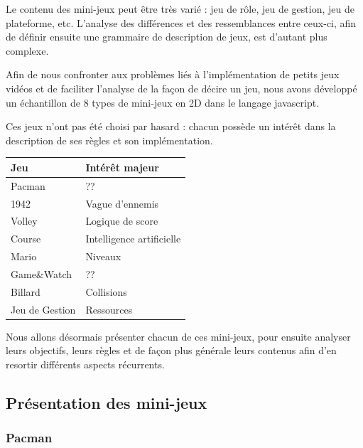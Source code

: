 Le contenu des mini-jeux peut être très varié : jeu de rôle, jeu de gestion, jeu de plateforme, etc.
L'analyse des différences et des ressemblances entre ceux-ci, afin de définir ensuite une grammaire de description de jeux, est d'autant plus complexe.

Afin de nous confronter aux problèmes liés à l'implémentation de petits jeux vidéos et de faciliter l'analyse de la façon de décire un jeu, 
nous avons développé un échantillon de 8 types de mini-jeux en 2D dans le langage javascript.

Ces jeux n'ont pas été choisi par hasard : chacun possède un intérêt dans la description de ses règles et son implémentation.

\vspace{0.5cm}

\begin{tabular}{l|l}
 Jeu & Intérêt majeur \\
 \hline
 Pacman & ?? \\
 1942 & Vague d'ennemis \\
 Volley & Logique de score \\
 Course & Intelligence artificielle \\
 Mario & Niveaux \\
 Game\&Watch & ?? \\
 Billard & Collisions \\
 Jeu de Gestion & Ressources \\
\end{tabular}

\vspace{0.5cm}

Nous allons désormais présenter chacun de ces mini-jeux, pour ensuite analyser leurs objectifs, 
leurs règles et de façon plus générale leurs contenus afin d'en resortir différents aspects récurrents.

\subsection{Présentation des mini-jeux}


\subsubsection{Pacman}

